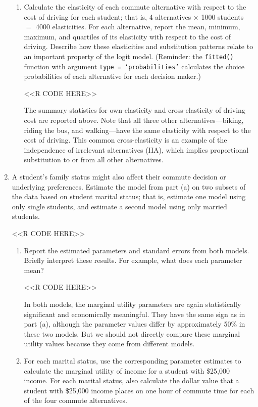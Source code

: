 \documentclass[11pt,letterpaper]{article}
\begin{document}
\begin{enumerate}[label=\alph*., leftmargin=*]
\begin{enumerate}[label=\roman*.]
		\item Calculate the elasticity of each commute alternative with respect to the cost of driving for each student; that is, 4 alternatives $\times$ 1000 students $=$ 4000 elasticities. For each alternative, report the mean, minimum, maximum, and quartiles of its elasticity with respect to the cost of driving. Describe how these elasticities and substitution patterns relate to an important property of the logit model. (Reminder: the \texttt{fitted()} function with argument \texttt{type = `probabilities'} calculates the choice probabilities of each alternative for each decision maker.)

		<<R CODE HERE>>

		The summary statistics for own-elasticity and cross-elasticity of driving cost are reported above. Note that all three other alternatives---biking, riding the bus, and walking---have the same elasticity with respect to the cost of driving. This common cross-elasticity is an example of the independence of irrelevant alternatives (IIA), which implies proportional substitution to or from all other alternatives.
	\end{enumerate}

	\item A student's family status might also affect their commute decision or underlying preferences. Estimate the model from part (a) on two subsets of the data based on student marital status; that is, estimate one model using only single students, and estimate a second model using only married students.

	<<R CODE HERE>>

	\begin{enumerate}[label=\roman*.]
		\item Report the estimated parameters and standard errors from both models. Briefly interpret these results. For example, what does each parameter mean?

		<<R CODE HERE>>

		In both models, the marginal utility parameters are again statistically significant and economically meaningful. They have the same sign as in part (a), although the parameter values differ by approximately 50\% in these two models. But we should not directly compare these marginal utility values because they come from different models.

		\item For each marital status, use the corresponding parameter estimates to calculate the marginal utility of income for a student with \$25,000 income. For each marital status, also calculate the dollar value that a student with \$25,000 income places on one hour of commute time for each of the four commute alternatives.


\end{enumerate}
\end{enumerate}
\end{document}
